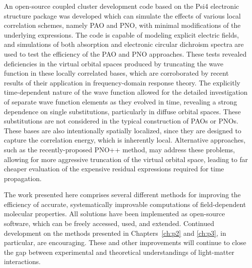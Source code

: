 An open-source coupled cluster development code based on the Psi4 electronic
structure package was developed which can simulate the effects of various
local correlation schemes, namely PAO and PNO, with minimal modifications
of the underlying expressions. The code is capable of modeling explicit
electric fields, and simulations of both absorption and electronic
circular dichroism spectra are used to test the efficiency of the PAO and
PNO approaches. These tests revealed deficiencies in the virtual orbital
spaces produced by truncating the wave function in these locally correlated
bases, which are corroborated by recent results of their application in
frequency-domain response theory. The explicitly time-dependent nature of
the wave function allowed for the detailed investigation of separate wave
function elements as they evolved in time, revealing a strong dependence
on single substitutions, particularly in diffuse orbital spaces. These
substitutions are not considered in the typical construction of PAOs
or PNOs. These bases are also intentionally spatially localized, since
they are designed to capture the correlation energy, which is inherently
local. Alternative approaches, such as the recently-proposed PNO++ method,
may address these problems, allowing for more aggressive truncation of the
virtual orbital space, leading to far cheaper evaluation of the expensive
residual expressions required for time propagation.

The work presented here comprises several different methods for improving
the efficiency of accurate, systematically improvable computations of 
field-dependent molecular properties. All solutions have been implemented
as open-source software, which can be freely accessed, used, and extended.
Continued development on the methods presented in Chapters~\ref{ch:p2} 
and \ref{ch:p3}, in particular, are encouraging. 
These and other improvements will continue to close the
gap between experimental and theoretical understandings of light-matter
interactions.
